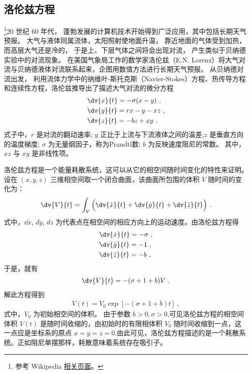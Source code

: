 

\subsection{洛伦兹方程}

\footnote{参考 Wikipedia \href{https://en.wikipedia.org/wiki/Lorenz_system}{相关页面}。}20 世纪 60 年代， 蓬勃发展的计算机技术开始得到广泛应用，其中包括长期天气预报。 大气与液体同属流体，太阳照射使地面升温， 靠近地面的气体受到加热， 而高层大气还是冷的， 于是上、下层气体之间将会出现对流， 产生类似于贝纳德实验中的对流现象。 在美国气象局工作的数学家洛伦兹（E.N. Lorenz）将大气对流与贝纳德液体对流联系起来，企图用数值方法进行长期天气预报。 从贝纳德对流出发， 利用流体力学中的纳维叶-斯托克斯（Navier-Stokes）方程、热传导方程和连续性方程，洛伦兹推导出了描述大气对流的微分方程
\begin{align}
&\dv{x}{t}=-\sigma (x-y)~,\\
&\dv{y}{t}=rx-y-xz~,\\
&\dv{z}{t}=-bz+xy~.
\end{align}
式子中，$r$ 是对流的翻动速率; $y$ 正比于上流与下流液体之间的温差;$z$ 是垂直方向的温度梯度; $\sigma$ 为无量纲因子，称为Prandtl数; $b$ 为反映速度阻尼的常数。 其中，$xz$ 与 $xy$ 是非线性项。

洛伦兹方程是一个能量耗散系统，这可以从它的相空间随时间变化的特性来证明。设在 $(x,y, z)$ 三维相空间取一个闭合曲面，该曲面所包围的体积 $V$ 随时间的变化为：
\begin{align}
\dv{V}{t}=\int_V \Big(\dv{\dot{x}}{t}+\dv{\dot{y}}{t}+\dv{\dot{z}}{t}\Big)~.
\end{align}
式中，$\dd{\dot{x}}$, $d\dot{y}$, $d\dot{z}$ 为代表点在相空间的相应方向上的运动速度。由洛伦兹方程得
\begin{align}
&\dv{\dot{x}}{t}=-\sigma~,\\
&\dv{\dot{y}}{t}=-1~,\\
&\dv{\dot{z}}{t}=-b~,
\end{align}
于是，就有
\begin{align}
\dv{V}{t}=-(\sigma+1+b)V~.
\end{align}
解此方程得到
\begin{align}
V(t)=V_0\exp[-(\sigma+1+b)t]~,
\end{align}
式中，$V_0$ 为初始相空间的体积。 由于参数 $b>0,\sigma>0$,可见洛伦兹方程的相空间体积 $V(t)$ 是随时间收缩的，由初始时的有限相体积 $V_0$ 随时间收缩到一点，这一点应是坐标系的原点 $x=y=z=0$.由此可见，洛伦兹方程描述的是一个耗散系统。正如阻尼单摆那样，耗散意味着系统存在吸引子。

